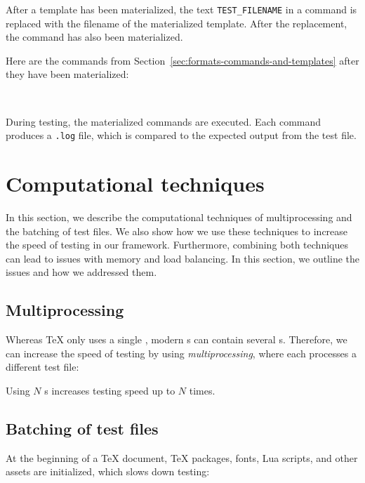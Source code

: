 \documentclass[final]{ltugboat}
\begin{document}
\smallskip
\exampleSeparator

\smallskip
\noindent
{}

\smallskip

After a template has been materialized, the text \texttt{TEST\_FILENAME} in a command is replaced with the filename of the materialized template. After the replacement, the command has also been materialized.

Here are the commands  from Section~\ref{sec:formats-commands-and-templates} after they have been materialized:

\smallskip
\noindent
{} \\[0.8em]

\smallskip

\noindent
During testing, the materialized commands are executed. Each command produces a \texttt{.log} file, which is compared to the expected output from the test file.

\section{Computational techniques}
\label{sec:computational-techniques}

In this section, we describe the computational techniques of multiprocessing and the batching of test files. We also show how we use these techniques to increase the speed of testing in our framework. Furthermore, combining both techniques can lead to issues with memory and load balancing. In this section, we outline the issues and how we addressed them.

\subsection{Multiprocessing}
\label{sec:multiprocessing}
Whereas \TeX{} only uses a single , modern s can contain several s. Therefore, we can increase the speed of testing by using \emph{multiprocessing}, where each  processes a different test file:

\smallskip
\noindent
\begingroup
\centering

\par
\endgroup

\smallskip
\noindent
Using $N$ s increases testing speed up to $N$ times.

\subsection{Batching of test files}
\label{sec:batching-of-test-files}
At the beginning of a \TeX{} document, \TeX{} packages, fonts, Lua scripts, and other assets are initialized, which slows down testing:
\end{document}
